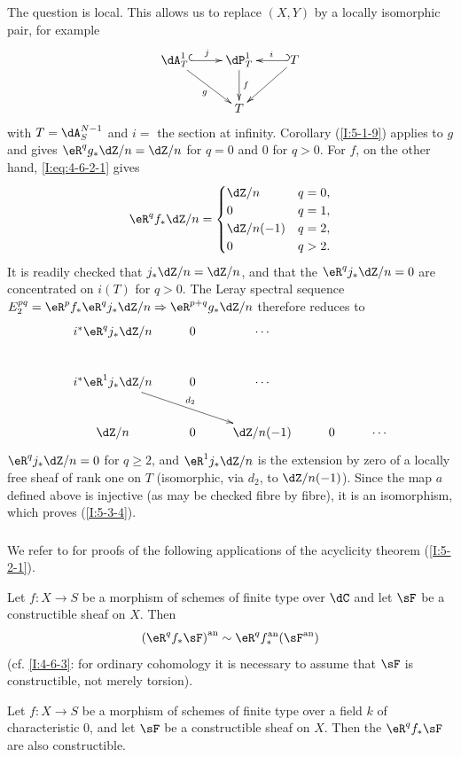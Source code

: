 The question is local. This allows us to replace $(X,Y)$ by a locally
isomorphic pair, for example
\[\xymatrix{
  \dA_T^1 \ar@{^{(}->}[r]^-j \ar[dr]_-g
    & \dP_T^1 \ar[d]^-f
    & \ar@{_{(}->}[l]_-i T \ar[dl] \\
  & T
}\]
with $T=\dA_S^{N-1}$ and $i=$ the section at infinity. Corollary
(\ref{I:5-1-9}) applies to $g$ and gives
$\eR^qg_*\dZ/n=\dZ/n$ for $q=0$ and $0$ for $q>0$. For $f$, on the
other hand, \eqref{I:eq:4-6-2-1} gives
\[
  \eR^q f_* \dZ/n =
  \begin{cases}
    \dZ/n & q=0,\\
    0 & q=1,\\
    \dZ/n(-1) & q=2,\\
    0 & q>2.
  \end{cases}
\]
It is readily checked that $j_*\dZ/n=\dZ/n$, and that the
$\eR^qj_*\dZ/n=0$ are concentrated on $i(T)$ for $q>0$. The Leray
spectral sequence
$E_2^{pq}=\eR^pf_*\eR^qj_*\dZ/n\Rightarrow\eR^{p+q}g_*\dZ/n$ therefore
reduces to
\[\xymatrix{
  i^* \eR^q j_* \dZ/n & 0 & \cdots \\
  i^* \eR^1 j_* \dZ/n \ar[drr]^-{d_2} & 0 & \cdots \\
  \dZ/n              & 0 & \dZ/n(-1) & 0 & \cdots
}\]
$\eR^qj_*\dZ/n=0$ for $q\geqslant2$, and $\eR^1j_*\dZ/n$ is the
extension by zero of a locally free sheaf of rank one on $T$ (isomorphic,
via $d_2$, to $\dZ/n(-1)$). Since the map $a$ defined above is injective
(as may be checked fibre by fibre), it is an isomorphism, which proves
(\ref{I:5-3-4}).

\subsubsection{}\label{I:5-3-5}

We refer to \cite[XVI.4,5]{sga4} for proofs of the following applications
of the acyclicity theorem (\ref{I:5-2-1}).

\begin{theorem}\label{I:5-3-6} %
Let $f:X\to S$ be a morphism of schemes of finite type over $\dC$ and
let $\sF$ be a constructible sheaf on $X$. Then
\[
  \an{(\eR^q f_*\sF)} \sim \eR^q \an f_* (\an\sF)
\]
(cf. \ref{I:4-6-3}: for ordinary cohomology it is necessary to assume
that $\sF$ is constructible, not merely torsion).
\end{theorem}

\begin{theorem}\label{I:5-3-7} %
Let $f:X\to S$ be a morphism of schemes of finite type over a field $k$
of characteristic $0$, and let $\sF$ be a constructible sheaf on $X$.
Then the $\eR^qf_*\sF$ are also constructible.
\end{theorem}

